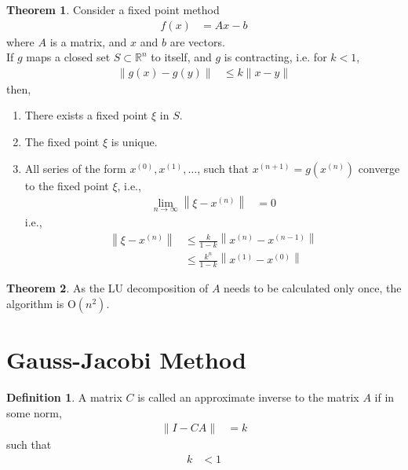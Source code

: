 \documentclass[fleqn, a4paper, 12pt, twoside, titlepage]{article}
\theoremstyle{definition}
\newtheorem{definition}{Definition}
\theoremstyle{theorem}
\newtheorem{theorem}{Theorem}
\begin{document}
\begin{theorem}
	Consider a fixed point method
	\begin{align*}
		f(x) &= A x - b
	\end{align*}
	where $A$ is a matrix, and $x$ and $b$ are vectors.\\
	If $g$ maps a closed set $S \subset \mathbb{R}^n$ to itself, and $g$ is contracting, i.e. for $k < 1$,
	\begin{align*}
		\left\| g(x) - g(y) \right\| &\le k \|x - y\|
	\end{align*}
	then,
	\begin{enumerate}
		\item
			There exists a fixed point $\xi$ in $S$.
		\item
			The fixed point $\xi$ is unique.
		\item
			All series of the form $x^{(0)},x^{(1)},\dots$, such that $x^{(n + 1)} = g\left( x^{(n)} \right)$ converge to the fixed point $\xi$, i.e.,
			\begin{align*}
				\lim\limits_{n \to \infty} \left\| \xi - x^{(n)} \right\| &= 0
			\end{align*}
			i.e.,
			\begin{align*}
				\left\| \xi - x^{(n)} \right\| &\le \frac{k}{1 - k} \left\| x^{(n)} - x^{(n - 1)} \right\|\\
				&\le \frac{k^n}{1 - k} \left\| x^{(1)} - x^{(0)} \right\|
			\end{align*}
	\end{enumerate}
\end{theorem}

\begin{theorem}
	As the LU decomposition of $A$ needs to be calculated only once, the algorithm is $\mathrm{O}\left( n^2 \right)$.
\end{theorem}

\section{Gauss-Jacobi Method}

\begin{definition}
	A matrix $C$ is called an approximate inverse to the matrix $A$ if in some norm,
	\begin{align*}
		\|I - C A\| &= k
	\end{align*}
	such that
	\begin{align*}
		k &< 1
	\end{align*}
\end{definition}
\end{document}
